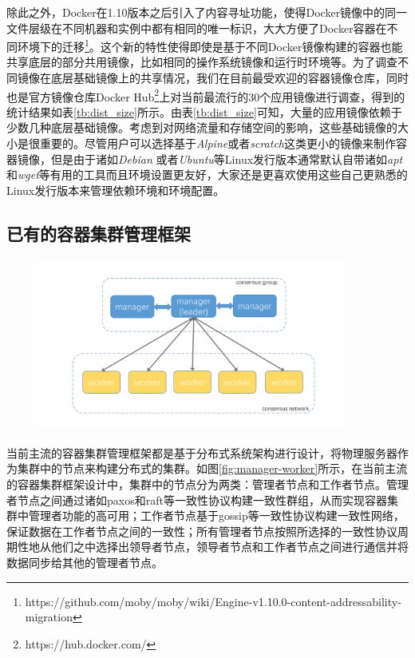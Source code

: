 除此之外，Docker在1.10版本之后引入了内容寻址功能，使得Docker镜像中的同一文件层级在不同机器和实例中都有相同的唯一标识，大大方便了Docker容器在不同环境下的迁移\footnote{https://github.com/moby/moby/wiki/Engine-v1.10.0-content-addressability-migration}。这个新的特性使得即使是基于不同Docker镜像构建的容器也能共享底层的部分共用镜像，比如相同的操作系统镜像和运行时环境等。为了调查不同镜像在底层基础镜像上的共享情况，我们在目前最受欢迎的容器镜像仓库，同时也是官方镜像仓库Docker Hub\footnote{https://hub.docker.com/}上对当前最流行的30个应用镜像进行调查，得到的统计结果如表\ref{tb:dist_size}所示。由表\ref{tb:dist_size}可知，大量的应用镜像依赖于少数几种底层基础镜像。考虑到对网络流量和存储空间的影响，这些基础镜像的大小是很重要的。尽管用户可以选择基于\emph{Alpine}或者\emph{scratch}这类更小的镜像来制作容器镜像，但是由于诸如\emph{Debian} 或者\emph{Ubuntu}等Linux发行版本通常默认自带诸如\emph{apt}和\emph{wget}等有用的工具而且环境设置更友好，大家还是更喜欢使用这些自己更熟悉的Linux发行版本来管理依赖环境和环境配置。

\subsection{已有的容器集群管理框架}
\begin{figure}[htbp]
\centering
\includegraphics[width=0.9\textwidth]{./figure/manager-worker}
\end{figure}
当前主流的容器集群管理框架都是基于分布式系统架构进行设计，将物理服务器作为集群中的节点来构建分布式的集群。如图\ref{fig:manager-worker}所示，在当前主流的容器集群框架设计中，集群中的节点分为两类：管理者节点和工作者节点。管理者节点之间通过诸如paxos和raft等一致性协议构建一致性群组，从而实现容器集群中管理者功能的高可用；工作者节点基于gossip等一致性协议构建一致性网络，保证数据在工作者节点之间的一致性；所有管理者节点按照所选择的一致性协议周期性地从他们之中选择出领导者节点，领导者节点和工作者节点之间进行通信并将数据同步给其他的管理者节点。

